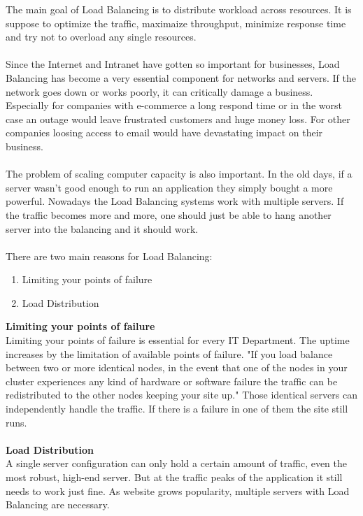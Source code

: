 \documentclass[12p]{article}
\begin{document}
	
	The main goal of Load Balancing is to distribute workload across resources. It is suppose to optimize the traffic, maximaize throughput, minimize response time and try not to overload any single resources. \\\\
	Since the Internet and Intranet have gotten so important for businesses, Load Balancing has become a very essential component for networks and servers. If the network goes down or works poorly, it can critically damage a business. Especially for companies with e-commerce a long respond time or in the worst case an outage would leave frustrated customers and huge money loss. For other companies loosing access to email would have devastating impact on their business.  \cite{lb_SFC} \\\\
	The problem of scaling computer capacity is also important. In the old days, if a server wasn't good enough to run an application they simply bought a more powerful.  Nowadays the Load Balancing systems work with multiple servers. If the traffic becomes more and more, one should just be able to hang another server into the balancing and it should work.\cite{lb_SFC} \\\\
	There are two main reasons for Load Balancing: 
	\begin{enumerate}
		\item Limiting your points of failure
		\item Load Distribution
		\\
	\end{enumerate}
	\textbf{Limiting your points of failure}\\
	Limiting your points of failure is essential for every IT Department. The uptime increases by the limitation of available points of failure. "If you load balance between two or more identical nodes, in the event that one of the nodes in your cluster experiences any kind of hardware or software failure the traffic can be redistributed to the other nodes keeping your site up." \cite{liquidweb} Those identical servers can independently handle the traffic. If there is a failure in one of them the site still runs.
	\\\\
	\textbf{Load Distribution}\\ 
	A single server configuration can only hold a certain amount of traffic, even the most robust, high-end server. But at the traffic peaks of the application it still needs to work just fine. As website grows popularity, multiple servers with Load Balancing are necessary. \cite{liquidweb}
	
\end{document}

